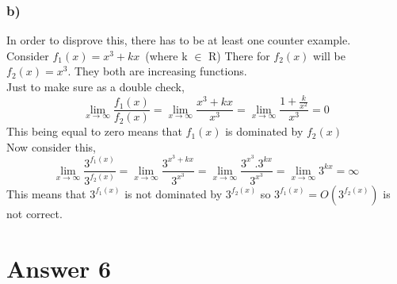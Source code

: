 \documentclass[12pt]{article}
\begin{document}
\subsubsection*{b)}
In order to disprove this, there has to be at least one counter example. \\
Consider $f_1(x)=x^3+kx$\  (where k $\in$ R) There for $f_2(x)$ will be $f_2(x)=x^3$. They both are increasing functions. \\
Just to make sure as a double check, $$\lim_{x \to\infty}\frac{f_1(x)}{f_2(x)}=\lim_{x \to\infty}\frac{x^3+kx}{x^3}=\lim_{x \to\infty}\frac{1+\frac{k}{x^2}}{x^3}=0$$ This being equal to zero means that $f_1(x)$ is dominated by $f_2(x)$ \\
Now consider this,
$$\lim_{x \to\infty}\frac{3^{f_1(x)}}{3^{f_2(x)}}=\lim_{x \to\infty}\frac{3^{x^3+kx}}{3^{x^3}}=\lim_{x \to\infty}\frac{3^{x^3}.3^{kx}}{3^{x^3}}=\lim_{x \to\infty}3^{kx}=\infty$$
This means that $3^{f_1(x)}$ is not dominated by $3^{f_2(x)}$ so $3^{f_1(x)}=O(3^{f_2(x)})$ is not correct.

\section*{Answer 6}
\end{document}
